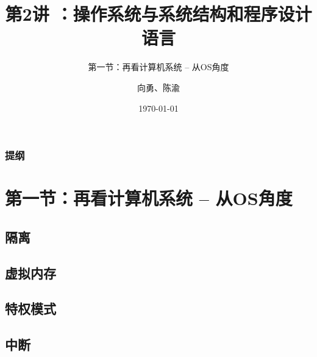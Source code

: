 \documentclass[UTF8]{ctexbeamer}
\title[第2讲]{第2讲 ：操作系统与系统结构和程序设计语言} %
\subtitle{第一节：再看计算机系统 -- 从OS角度}
\author{向勇、陈渝} %
\institute[清华大学] %
{
清华大学计算机系 \\ %
\medskip
\textit{xyong,yuchen@tsinghua.edu.cn} %
}
\date{\today} %
\begin{document}
\begin{frame}
\titlepage %
\end{frame}

\begin{frame}
\frametitle{提纲} %
\tableofcontents %
\end{frame}


\section{第一节：再看计算机系统 -- 从OS角度 } %

\subsection{隔离} %
\subsection{虚拟内存}
\subsection{特权模式}
\subsection{中断}
\end{document}

